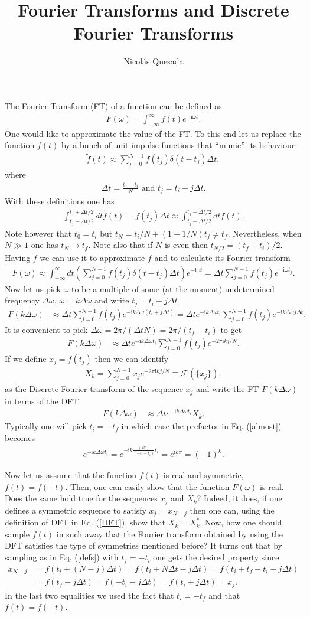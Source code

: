 \documentclass[11pt,letterpaper]{article}
\title{Fourier Transforms and Discrete Fourier Transforms}
\author{Nicol\'as Quesada}
\newcommand{\ii}{\mathrm{i}}
\newcommand{\eq}[1]{\begin{align}#1\end{align}}
\begin{document}
\maketitle
The Fourier Transform (FT) of a function can be defined as
\eq{
F(\omega)=\int_{-\infty}^\infty f(t) e^{-\ii \omega t}.
}
One would like to approximate the value of the FT. To this end let us replace the function $f(t)$ by a bunch of unit impulse functions that ``mimic'' its behaviour 
\eq{
\tilde f(t) \approx \sum_{j=0}^{N-1} f(t_j) \delta(t-t_j) \Delta t,
}
where 
\eq{\label{defs}
\Delta t=\frac{t_f-t_i}{N} \text{ and } t_j=t_i+j \Delta t.
}
With these definitions one has
\eq{
\int_{t_j-\Delta t/2}^{t_j+\Delta t/2} dt \tilde f(t) = f(t_j) \Delta t \approx \int_{t_j-\Delta t/2}^{t_j+\Delta t/2} dt f(t).
}
Note however that $t_0=t_i$ but $t_N=t_i/N+(1-1/N) t_f \neq t_f$. Nevertheless, when $N \gg 1$ one has $t_N \to t_f$. Note also that if $N$ is even then $t_{N/2}=(t_f+t_i)/2$. 
Having $\tilde f$ we can use it to approximate $f$ and to calculate its Fourier transform
\eq{
F(\omega) \approx \int_{-\infty}^\infty dt \left(\sum_{j=0}^{N-1} f(t_j) \delta(t-t_j) \Delta t \right) e^{-\ii \omega t}=\Delta t \sum_{j=0}^{N-1} f(t_j) e^{-\ii \omega t_j}.
}
Now let us pick $\omega$ to be a multiple of some (at the moment) undetermined frequency $\Delta \omega$, $\omega=k \Delta \omega$ and write $t_j=t_i+j \Delta t$
\eq{
F(k \Delta \omega)&\approx \Delta t\sum_{j=0}^{N-1} f(t_j) e^{-\ii k \Delta \omega (t_i+j \Delta t)}=\Delta t e^{-\ii k \Delta \omega t_i}\sum_{j=0}^{N-1} f(t_j) e^{-\ii k \Delta \omega j \Delta t}.
}
It is convenient to pick $\Delta \omega = 2 \pi/(\Delta t N)=2 \pi /(t_f-t_i)$ to get
\eq{\label{almost}
F(k \Delta \omega)&\approx \Delta t e^{-\ii k \Delta \omega t_i}\sum_{j=0}^{N-1} f(t_j) e^{-2 \pi \ii k  j/N}.
}
If we define $x_j=f(t_j)$ then we can identify
\eq{\label{DFT}
X_k=\sum_{j=0}^{N-1} x_j e^{-2 \pi \ii k  j/N}\equiv \mathcal{F}\left(\{x_j \}\right),
}
as the Discrete Fourier transform of the sequence $x_j$ and write the FT  $F(k \Delta \omega)$ in terms of the DFT
\eq{\label{quasi}
F(k \Delta \omega)&\approx \Delta t e^{-\ii k \Delta \omega t_i} X_k.
}
Typically one will pick $t_i=-t_f$ in which case the prefactor in Eq. (\ref{almost}) becomes
\eq{
e^{-\ii k \Delta \omega t_i}=e^{-\ii k \frac{(2 \pi)}{(-t_i-t_i)} t_i}=e^{\ii k \pi}=(-1)^k.
}

Now let us assume that the function $f(t)$ is real and symmetric, $f(t)=f(-t)$. Then, one can easily show that the function $F(\omega)$ is real. Does the same hold true for the sequences $x_j$ and $X_k$? Indeed, it does, if one defines a symmetric sequence to satisfy $x_j=x_{N-j}$ then one can, using the definition of DFT in Eq. (\ref{DFT}), show that $X_k=X_k^*$. Now, how one should sample $f(t)$ in such away that the Fourier transform obtained by using the DFT satisfies the type of symmetries mentioned before?
It turns out that by sampling as in Eq. (\ref{defs}) with $t_f=-t_i$ one gets the desired property since
\eq{
x_{N-j}&=f(t_i+(N-j)\Delta t)=f(t_i+N\Delta t-j\Delta t)=f(t_i+t_f-t_i-j \Delta t  )\\
&=f(t_f-j\Delta t )=f(-t_i-j \Delta t )=f(t_i+j \Delta t )=x_j. \nonumber
}
In the last two equalities we used the fact that $t_i=-t_f$ and that $f(t)=f(-t)$.
\end{document}
